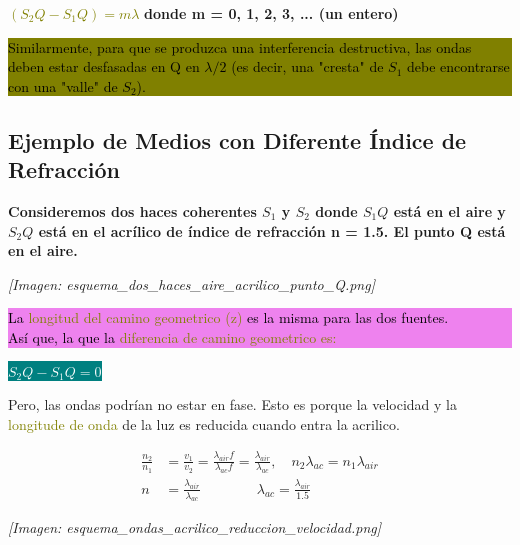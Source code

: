 \documentclass[12pt]{article}
\begin{document}
	\vspace{0.5cm}
	\textcolor{olive}{\textbf{$(S_2Q - S_1Q) = m\lambda$}} \qquad \textbf{donde m = 0, 1, 2, 3, ... (un entero)}
	
	\colorbox{olive}{\parbox{\textwidth}{\textcolor{black}{Similarmente, para que se produzca una interferencia destructiva, las ondas deben estar desfasadas en Q en $\lambda/2$ (es decir, una "cresta" de $S_1$ debe encontrarse con una "valle" de $S_2$).}}}
	
	\subsection{Ejemplo de Medios con Diferente Índice de Refracción}
	\textbf{Consideremos dos haces coherentes $S_1$ y $S_2$ donde $S_1Q$ está en el aire y $S_2Q$ está en el acrílico de índice de refracción n = 1.5. El punto Q está en el aire.}
	
	\begin{center}
		\textit{[Imagen: esquema\_dos\_haces\_aire\_acrilico\_punto\_Q.png]}
	\end{center}
	
	\colorbox{violet}{\parbox{\textwidth}{\textcolor{black}{La \textcolor{olive}{longitud del camino geometrico (z)} es la misma para las dos fuentes. \\ Así que, la que la \textcolor{olive}{diferencia de camino geometrico es:}}}}
	\begin{center}
		\colorbox{teal}{\textcolor{white}{\textbf{$S_2Q - S_1Q = 0$}}}
	\end{center}
	
	Pero, las ondas podrían no estar en fase. Esto es porque la velocidad y la \textcolor{olive}{longitude de onda} de la luz es reducida cuando entra la acrilico.
	
	\begin{minipage}{0.6\textwidth}
		\begin{align*}
			\frac{n_2}{n_1} &= \frac{v_1}{v_2} = \frac{\lambda_{air} f}{\lambda_{ac} f} = \frac{\lambda_{air}}{\lambda_{ac}}, \quad n_2 \lambda_{ac} = n_1 \lambda_{air} \\
			n &= \frac{\lambda_{air}}{\lambda_{ac}} \qquad \qquad \lambda_{ac} = \frac{\lambda_{air}}{1.5}
		\end{align*}
	\end{minipage}
	\begin{minipage}{0.35\textwidth}
		\textit{[Imagen: esquema\_ondas\_acrilico\_reduccion\_velocidad.png]}
	\end{minipage}
	
\end{document}

